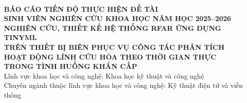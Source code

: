 \documentclass[a4paper]{article}
\begin{document}
\thispagestyle{empty}
\begin{center}
    \fontsize{13pt}{15pt}\\
    \vspace{3.8cm}
    \textbf{BÁO CÁO TIẾN ĐỘ THỰC HIỆN ĐỀ TÀI}\\
    \vspace{1.5cm}
    \textbf{SINH VIÊN NGHIÊN CỨU KHOA HỌC NĂM HỌC 2025--2026}\\
    \vspace{3.0cm}
    \textbf{NGHIÊN CỨU, THIẾT KẾ HỆ THỐNG RFAR ỨNG DỤNG TINYML}\\
    \textbf{TRÊN THIẾT BỊ BIÊN PHỤC VỤ CÔNG TÁC PHÂN TÍCH}\\
    \textbf{HOẠT ĐỘNG LÍNH CỨU HỎA THEO THỜI GIAN THỰC}\\
    \textbf{TRONG TÌNH HUỐNG KHẨN CẤP}\\
    \vspace{1.5cm}
    Lĩnh vực khoa học và công nghệ: Khoa học kỹ thuật và công nghệ\\
    Chuyên ngành thuộc lĩnh vực khoa học và công nghệ: Kỹ thuật điện tử và viễn thông
\end{center}
\fontsize{13pt}{15pt}

\pagebreak

\fontsize{13pt}{15pt}\selectfont

\setcounter{page}{1}

\renewcommand*\contentsname{\centering\fontsize{13pt}{15pt}\selectfont{MỤC LỤC}}
\label{Muc_Luc}
\end{document}
